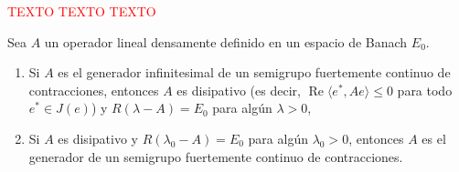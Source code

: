 \textcolor{red}{TEXTO TEXTO TEXTO}\\

\begin{Teorema}
    \label{ch:semigrupos:th:LumerPhillips}
    Sea $A$ un operador lineal densamente definido en un espacio de Banach $E_0$.

    \begin{enumerate}
        \item Si $A$ es el generador infinitesimal de un semigrupo fuertemente continuo de contracciones, entonces $A$ es disipativo (es decir, $\operatorname{Re}\langle e^*, Ae \rangle \leq 0$ para todo $e^* \in J(e)$) y $R(\lambda - A) = E_0$ para algún $\lambda >0$,

        \item Si $A$ es disipativo y $R(\lambda_0 - A) = E_0$ para algún $\lambda_0 > 0$, entonces $A$ es el generador de un semigrupo fuertemente continuo de contracciones.
    \end{enumerate}
\end{Teorema}

